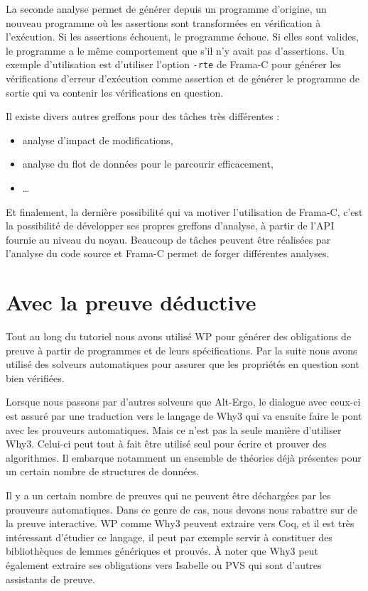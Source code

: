 \documentclass[12pt,francais,]{scrbook}
\providecommand{\tightlist}{%
  \setlength{\itemsep}{0pt}\setlength{\parskip}{0pt}}
\begin{document}
La seconde analyse permet de générer depuis un programme d'origine, un
nouveau programme où les assertions sont transformées en vérification à
l'exécution. Si les assertions échouent, le programme échoue. Si elles
sont valides, le programme a le même comportement que s'il n'y avait pas
d'assertions. Un exemple d'utilisation est d'utiliser l'option
\texttt{-rte} de Frama-C pour générer les vérifications d'erreur
d'exécution comme assertion et de générer le programme de sortie qui va
contenir les vérifications en question.

Il existe divers autres greffons pour des tâches très différentes :

\begin{itemize}
\tightlist
\item
  analyse d'impact de modifications,
\item
  analyse du flot de données pour le parcourir efficacement,
\item
  \ldots{}
\end{itemize}

Et finalement, la dernière possibilité qui va motiver l'utilisation de
Frama-C, c'est la possibilité de développer ses propres greffons
d'analyse, à partir de l'API fournie au niveau du noyau. Beaucoup de
tâches peuvent être réalisées par l'analyse du code source et Frama-C
permet de forger différentes analyses.

\section{Avec la preuve déductive}\label{avec-la-preuve-duxe9ductive}

Tout au long du tutoriel nous avons utilisé WP pour générer des
obligations de preuve à partir de programmes et de leurs spécifications.
Par la suite nous avons utilisé des solveurs automatiques pour assurer
que les propriétés en question sont bien vérifiées.

Lorsque nous passons par d'autres solveurs que Alt-Ergo, le dialogue
avec ceux-ci est assuré par une traduction vers le langage de Why3 qui
va ensuite faire le pont avec les prouveurs automatiques. Mais ce n'est
pas la seule manière d'utiliser Why3. Celui-ci peut tout à fait être
utilisé seul pour écrire et prouver des algorithmes. Il embarque
notamment un ensemble de théories déjà présentes pour un certain nombre
de structures de données.

Il y a un certain nombre de preuves qui ne peuvent être déchargées par
les prouveurs automatiques. Dans ce genre de cas, nous devons nous
rabattre sur de la preuve interactive. WP comme Why3 peuvent extraire
vers Coq, et il est très intéressant d'étudier ce langage, il peut par
exemple servir à constituer des bibliothèques de lemmes génériques et
prouvés. À noter que Why3 peut également extraire ses obligations vers
Isabelle ou PVS qui sont d'autres assistants de preuve.
\end{document}
